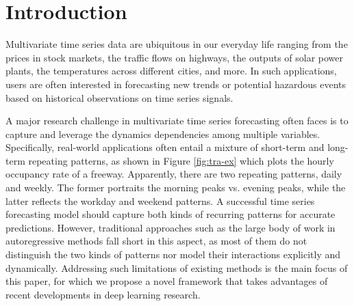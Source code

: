 \section{Introduction}
\label{sec:intro}

Multivariate time series data are ubiquitous in our everyday life ranging from the prices in stock markets, the traffic flows on highways, the outputs of solar power plants, the temperatures across different cities, and more. In such applications, users are often interested in forecasting new trends or potential hazardous events based on historical observations on time series signals.

A major research challenge in multivariate time series forecasting often faces is to capture and leverage the dynamics dependencies among multiple variables.  Specifically, real-world applications often entail a mixture of short-term and long-term repeating patterns, as shown in Figure \ref{fig:tra-ex} which plots the hourly occupancy rate of a freeway.
Apparently, there are two repeating patterns, daily and weekly. The former portraits the morning peaks vs. evening peaks, while the latter reflects the workday and weekend patterns. A successful time series forecasting model should capture both kinds of recurring patterns for accurate predictions. 
However, traditional approaches such as the large body of work in autoregressive methods \cite{hamilton1994time,box2015time,zhang2003time,Yu_NIPS_16,li2014forecasting} fall short in this aspect, as most of them do not distinguish the two kinds of patterns nor model their interactions explicitly and dynamically. Addressing such limitations of existing methods is the main focus of this paper, for which we propose a novel framework that takes advantages of recent developments in deep learning research.
    
